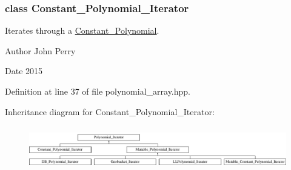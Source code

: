 \subsubsection{class Constant\+\_\+\+Polynomial\+\_\+\+Iterator}
Iterates through a \hyperlink{group__polygroup_class_constant___polynomial}{Constant\+\_\+\+Polynomial}. 

\begin{DoxyAuthor}{Author}
John Perry 
\end{DoxyAuthor}
\begin{DoxyDate}{Date}
2015 
\end{DoxyDate}


Definition at line 37 of file polynomial\+\_\+array.\+hpp.

Inheritance diagram for Constant\+\_\+\+Polynomial\+\_\+\+Iterator\+:\begin{figure}[H]
\begin{center}
\leavevmode
\includegraphics[height=2.000000cm]{group___iterator_group}
\end{center}
\end{figure}
